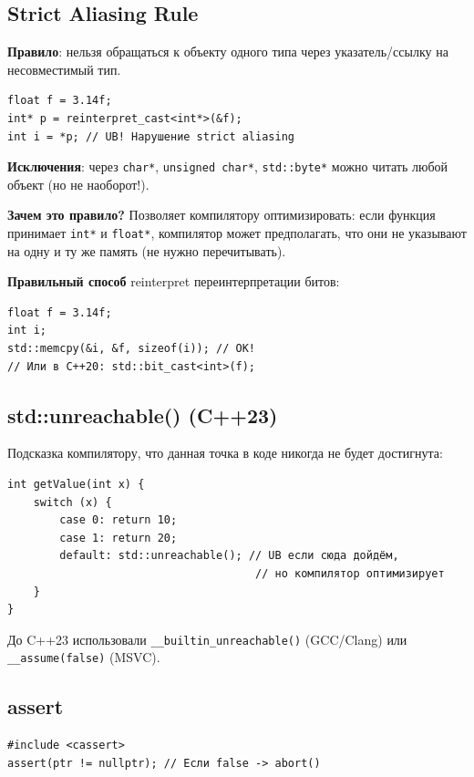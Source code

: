 \documentclass[12pt,a4paper]{article}
\begin{document}
\subsection{Strict Aliasing Rule}

\textbf{Правило}: нельзя обращаться к объекту одного типа через указатель/ссылку на несовместимый тип.

\begin{lstlisting}
float f = 3.14f;
int* p = reinterpret_cast<int*>(&f);
int i = *p; // UB! Нарушение strict aliasing
\end{lstlisting}

\textbf{Исключения}: через \texttt{char*}, \texttt{unsigned char*}, \texttt{std::byte*} можно читать любой объект (но не наоборот!).

\textbf{Зачем это правило?} Позволяет компилятору оптимизировать: если функция принимает \texttt{int*} и \texttt{float*}, компилятор может предполагать, что они не указывают на одну и ту же память (не нужно перечитывать).

\textbf{Правильный способ} reinterpret переинтерпретации битов:
\begin{lstlisting}
float f = 3.14f;
int i;
std::memcpy(&i, &f, sizeof(i)); // OK!
// Или в C++20: std::bit_cast<int>(f);
\end{lstlisting}

\subsection{std::unreachable() (C++23)}

Подсказка компилятору, что данная точка в коде никогда не будет достигнута:
\begin{lstlisting}
int getValue(int x) {
    switch (x) {
        case 0: return 10;
        case 1: return 20;
        default: std::unreachable(); // UB если сюда дойдём,
                                      // но компилятор оптимизирует
    }
}
\end{lstlisting}

До C++23 использовали \texttt{\_\_builtin\_unreachable()} (GCC/Clang) или \texttt{\_\_assume(false)} (MSVC).

\subsection{assert}

\begin{lstlisting}
#include <cassert>
assert(ptr != nullptr); // Если false -> abort()
\end{lstlisting}
\end{document}
